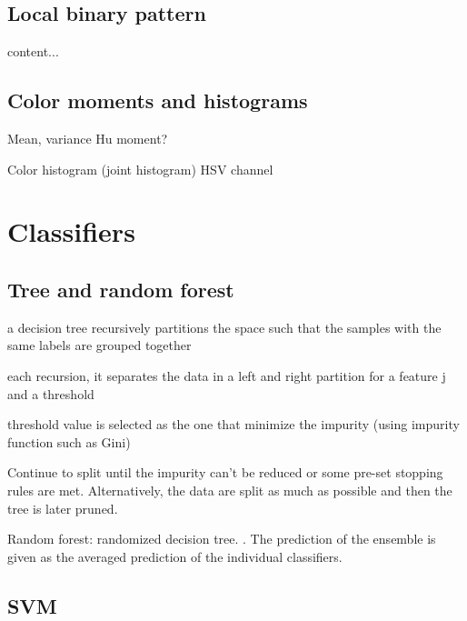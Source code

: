 \documentclass[aspectratio=169]{beamer}
\let\oldsection\section
\renewcommand{\section}[1]{
    \oldsection{#1}	
    \subsection{}
}
\newenvironment{myframe}[1][t]{\begin{frame}[#1]{\secname}{\subsecname}}{\end{frame}}
\begin{document}
    \subsection{Local binary pattern}
    
    \begin{myframe}
        content...
    \end{myframe}
    
    \subsection{Color moments and histograms}
    
    \begin{myframe}
        Mean, variance
        Hu moment?
        
        Color histogram (joint histogram)
        HSV channel
    \end{myframe}
    
    \section{Classifiers}
    
    \subsection{Tree and random forest}
    
    \begin{myframe}
        a decision tree recursively partitions the space such that the samples with the same labels are grouped together
        
        each recursion, it separates the data in a left and right partition for a feature j and a threshold
        
        threshold value is selected as the one that minimize the impurity (using impurity function such as Gini)
        
        Continue to split until the impurity can't be reduced or some pre-set stopping rules are met. Alternatively, the data are split as much as possible and then the tree is later pruned.
        
        Random forest: randomized decision tree. . The prediction of the ensemble is given as the averaged prediction of the individual classifiers.
    \end{myframe}
    
    \subsection{SVM}
    
\end{document}
